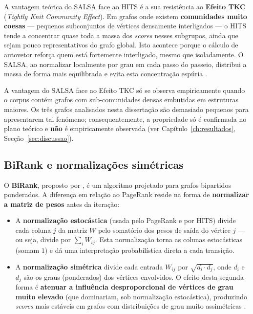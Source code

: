 A vantagem teórica do SALSA face ao HITS é a sua resistência ao
\textbf{Efeito TKC} (\emph{Tightly Knit Community Effect}). Em grafos
onde existem \textbf{comunidades muito coesas} --- pequenos
subconjuntos de vértices densamente interligados --- o HITS tende a
concentrar quase toda a massa dos \emph{scores} nesses subgrupos,
ainda que sejam pouco representativos do grafo global. Isto acontece
porque o cálculo de autovetor reforça quem está fortemente
interligado, mesmo que isoladamente. O SALSA, ao normalizar
localmente por grau em cada passo do passeio, distribui a massa de
forma mais equilibrada e evita esta concentração espúria
\parencite{lempel2001}.

\begin{notebox}
    A vantagem do SALSA face ao Efeito TKC só se observa
    empiricamente quando o corpus contém grafos com sub-comunidades
    densas embutidas em estruturas maiores. Os três grafos analisados
    nesta dissertação são demasiado pequenos para apresentarem tal
    fenómeno; consequentemente, a propriedade só é confirmada no
    plano teórico e \textbf{não} é empiricamente observada (ver
    Capítulo~\ref{ch:resultados}, Secção~\ref{sec:discussao}).
\end{notebox}

\subsection{BiRank e normalizações simétricas}
\label{sec:birank}

O \textbf{BiRank}, proposto por \citet{he2014}, é um algoritmo
projetado para grafos bipartidos ponderados. A diferença em relação
ao PageRank reside na forma de \textbf{normalizar a matriz de pesos}
antes da iteração:

\begin{itemize}
    \item A \textbf{normalização estocástica} (usada pelo PageRank e
        por HITS) divide cada coluna $j$ da matriz $W$ pelo somatório
        dos pesos de saída do vértice $j$ --- ou seja, divide por
        $\sum_i W_{ij}$. Esta normalização torna as colunas
        estocásticas (somam $1$) e dá uma interpretação probabilística
        direta a cada transição.
    \item A \textbf{normalização simétrica} divide cada entrada
        $W_{ij}$ por $\sqrt{d_i \cdot d_j}$, onde $d_i$ e $d_j$ são
        os graus (ponderados) dos vértices envolvidos. O efeito desta
        segunda forma é \textbf{atenuar a influência desproporcional
        de vértices de grau muito elevado} (que dominariam, sob
        normalização estocástica), produzindo \emph{scores} mais
        estáveis em grafos com distribuições de grau muito
        assimétricas \parencite{he2014, zhou2004}.
\end{itemize}

